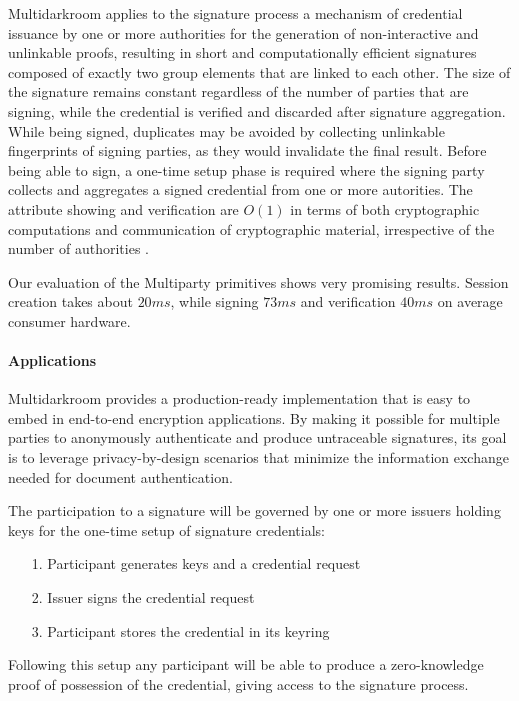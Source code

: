 \documentclass[twocolumn]{article}
\begin{document}
Multidarkroom applies to the signature process a mechanism of credential
issuance by one or more authorities for the generation of
non-interactive and unlinkable proofs, resulting in short and
computationally efficient signatures composed of exactly two group
elements that are linked to each other. The size of the signature
remains constant regardless of the number of parties that are signing,
while the credential is verified and discarded after signature
aggregation. While being signed, duplicates may be avoided by collecting
unlinkable fingerprints of signing parties, as they would invalidate the
final result. Before being able to sign, a one-time setup phase is
required where the signing party collects and aggregates a signed
credential from one or more autorities. The attribute showing and
verification are $O(1)$ in terms of both cryptographic computations and
communication of cryptographic material, irrespective of the number of
authorities \citep{coconut-2018}.

Our evaluation of the Multiparty primitives shows very promising
results. Session creation takes about $20ms$, while signing $73ms$ and
verification $40ms$ on average consumer hardware.

\paragraph*{Applications}

Multidarkroom provides a production-ready implementation that is easy to embed in end-to-end encryption applications. By making it possible for multiple parties to anonymously authenticate and produce untraceable signatures, its goal is to leverage privacy-by-design scenarios that minimize the information exchange needed for document authentication.

The participation to a signature will be governed by one or more issuers holding keys for the one-time setup of signature credentials:

\begin{itemize}
  \item[1.] Participant generates keys and a credential request
  \item[2.] Issuer signs the credential request
  \item[3.] Participant stores the credential in its keyring
\end{itemize}

Following this setup any participant will be able to produce a zero-knowledge proof of possession of the credential, giving access to the signature process.
\end{document}
